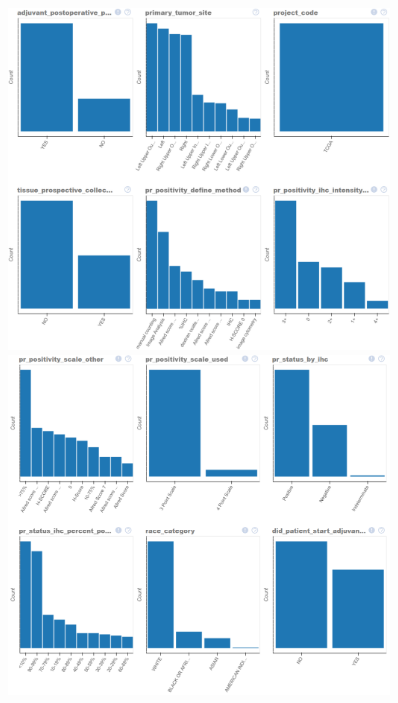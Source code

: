 \begin{figure}
	\includegraphics[width=0.9\textwidth]{NOTEBOOK/IMAGES_EDA/15}
	\includegraphics[width=0.9\textwidth]{NOTEBOOK/IMAGES_EDA/16}
\end{figure}

